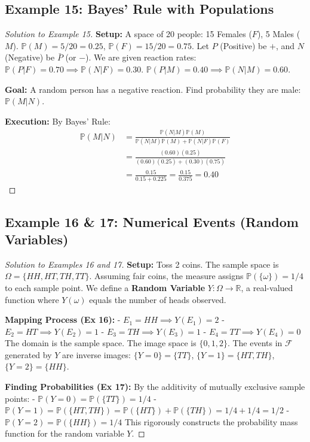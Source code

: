 \documentclass[12pt, a4paper]{article}
\theoremstyle{definition}
\theoremstyle{remark}
\newcommand{\R}{\mathbb{R}}
\newcommand{\Prob}{\mathbb{P}}
\newcommand{\F}{\mathcal{F}}
\newcommand{\W}{\Omega}
\newcommand{\1}{\mathbf{1}}
\begin{document}
\subsection*{Example 15: Bayes' Rule with Populations}
\begin{proof}[Solution to Example 15]
\textbf{Setup:} A space of 20 people: 15 Females ($F$), 5 Males ($M$). $\Prob(M) = 5/20 = 0.25$, $\Prob(F) = 15/20 = 0.75$. Let $P$ (Positive) be $+$, and $N$ (Negative) be $\bar{P}$ (or $-$).
We are given reaction rates: $\Prob(P|F) = 0.70 \implies \Prob(N|F) = 0.30$.
$\Prob(P|M) = 0.40 \implies \Prob(N|M) = 0.60$.

\textbf{Goal:} A random person has a negative reaction. Find probability they are male: $\Prob(M|N)$.

\textbf{Execution:}
By Bayes' Rule:
\begin{align*}
\Prob(M|N) &= \frac{\Prob(N|M)\Prob(M)}{\Prob(N|M)\Prob(M) + \Prob(N|F)\Prob(F)} \\
&= \frac{(0.60)(0.25)}{(0.60)(0.25) + (0.30)(0.75)} \\
&= \frac{0.15}{0.15 + 0.225} = \frac{0.15}{0.375} = 0.40
\end{align*}
\end{proof}

\subsection*{Example 16 \& 17: Numerical Events (Random Variables)}
\begin{proof}[Solution to Examples 16 and 17]
\textbf{Setup:} Toss 2 coins. The sample space is $\W = \{HH, HT, TH, TT\}$. Assuming fair coins, the measure assigns $\Prob(\{\omega\}) = 1/4$ to each sample point.
We define a \textbf{Random Variable} $Y: \W \to \R$, a real-valued function where $Y(\omega)$ equals the number of heads observed.

\textbf{Mapping Process (Ex 16):}
- $E_1 = HH \implies Y(E_1) = 2$
- $E_2 = HT \implies Y(E_2) = 1$
- $E_3 = TH \implies Y(E_3) = 1$
- $E_4 = TT \implies Y(E_4) = 0$
The domain is the sample space. The image space is $\{0, 1, 2\}$. The events in $\F$ generated by $Y$ are inverse images:
$\{Y=0\} = \{TT\}$, $\{Y=1\} = \{HT, TH\}$, $\{Y=2\} = \{HH\}$.

\textbf{Finding Probabilities (Ex 17):}
By the additivity of mutually exclusive sample points:
- $\Prob(Y=0) = \Prob(\{TT\}) = 1/4$
- $\Prob(Y=1) = \Prob(\{HT, TH\}) = \Prob(\{HT\}) + \Prob(\{TH\}) = 1/4 + 1/4 = 1/2$
- $\Prob(Y=2) = \Prob(\{HH\}) = 1/4$
This rigorously constructs the probability mass function for the random variable $Y$.
\end{proof}
\end{document}
